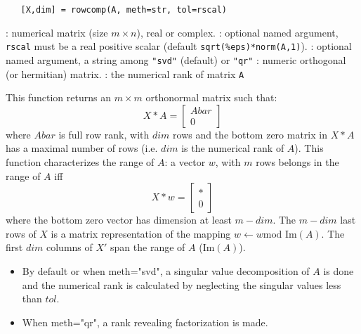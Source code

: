 
\begin{mandesc}
\end{mandesc}

\begin{calling_sequence}
\begin{verbatim}
   [X,dim] = rowcomp(A, meth=str, tol=rscal) 
\end{verbatim}
\end{calling_sequence}
\begin{parameters}
  \begin{varlist}
    :  numerical matrix (size $m \times n$), real or complex.
    : optional named argument, \verb+rscal+ must be  a real positive scalar 
    (default \verb+sqrt(%eps)*norm(A,1)+).
    : optional named argument, a string among \verb+"svd"+ (default) or \verb+"qr"+
    : numeric orthogonal (or hermitian) matrix.
    : the numerical rank of matrix \verb!A!
  \end{varlist}
\end{parameters}

\begin{mandescription}
This function returns an $m \times m$ orthonormal matrix such that:
$$
  X*A  = \left[ \begin{array}{c} Abar \\ 0 \end{array} \right] 
$$
where $Abar$ is full row rank, with $dim$ rows and the bottom zero matrix
in $X*A$ has a maximal number of rows (i.e. $dim$ is the numerical rank of $A$).
This function characterizes the range of $A$: a vector $w$, with $m$ rows
belongs in the range of $A$ iff 
$$
X*w  = \left[ \begin{array}{c} \ast \\ 0 \end{array} \right]
$$
where the bottom zero vector has dimension at least $m-dim$.
The $m-dim$ last rows of $X$ is a matrix representation of the mapping
$w \leftarrow w \text{mod Im} (A)$. 
The first $dim$ columns of $X'$ span the range of $A$ ($\text{Im}(A)$).
\begin{itemize}
\item By default or when  meth="svd", a singular value decomposition 
of $A$ is done and the numerical rank is calculated by 
neglecting the singular values less than $tol$.
\item When  meth="qr", a rank revealing factorization is made.
\end{itemize}
\end{mandescription}

